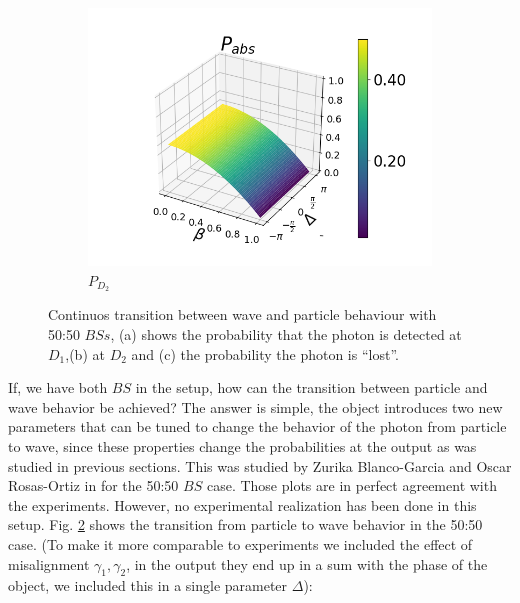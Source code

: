 \documentclass[12pt]{book}
\begin{document}
\begin{figure}[t!]
\begin{subfigure}[b]{0.40\linewidth}
\includegraphics[width=\linewidth]{images/pabs_2.png}
\caption{$P_{D_{2}}$ }
\label{fig:BS1}
\end{subfigure}
\caption{Continuos transition between wave and particle behaviour with 50:50 $BSs$, (a) shows the probability that the photon is detected at $D_{1}$,(b) at $D_{2}$ and (c) the probability the photon is ``lost''.}
\label{transzuri}
\end{figure}

If, we have both $BS$ in the setup, how can the transition between particle and wave behavior be achieved? The answer is simple, the object introduces two new parameters that can be tuned to change the behavior of the photon from particle to wave, since these properties change the probabilities at the output as was studied in previous sections. This was studied by Zurika Blanco-Garcia and Oscar Rosas-Ortiz in \cite{azuri} for the 50:50 $BS$ case. Those plots are in perfect agreement with the experiments. However, no experimental realization has been done in this setup. Fig. \ref{transzuri} shows the transition from particle to wave behavior in the 50:50 case. (To make it more comparable to experiments we included the effect of misalignment $\gamma_{1},\gamma_{2}$, in the output they end up in a sum with the phase of the object, we included this in a single parameter $\Delta$):
\end{document}
